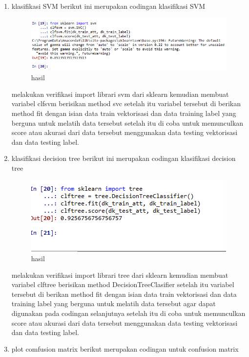 \begin{enumerate}
\item klasifikasi SVM
berikut ini merupakan codingan klasifikasi SVM 

\begin{figure}[ht]
\centering
\includegraphics[scale=0.5]{figures/1174002/4/ss2.PNG}
\caption{hasil}
\label{Praktek no 4}
\end{figure}
melakukan verifikasi import librari svm dari sklearn kemudian membuat variabel clfsvm berisikan method svc setelah itu variabel tersebut di berikan method fit dengan isian data train vektorisasi dan data training label yang berguna untuk melatih data tersebut setelah itu di coba untuk memunculkan score atau akurasi dari data tersebut menggunakan data testing vektorisasi dan data testing label.

\item klasifikasi decision tree 
berikut ini merupakan codingan klasifikasi decision tree

\begin{figure}[ht]
\centering
\includegraphics[scale=0.5]{figures/1174002/4/ss3.PNG}
\caption{hasil}
\label{Praktek no 5}
\end{figure}
melakukan verifikasi import librari tree dari sklearn kemudian membuat variabel clftree berisikan method DecisionTreeClasifier setelah itu variabel tersebut di berikan method fit dengan isian data train vektorisasi dan data training label yang berguna untuk melatih data tersebut agar dapat digunakan pada codingan selanjutnya setelah itu di coba untuk memunculkan score atau akurasi dari data tersebut menggunakan data testing vektorisasi dan data testing label.

\item plot comfusion matrix
berikut merupakan codingan untuk confusion matrix 



\end{enumerate}
